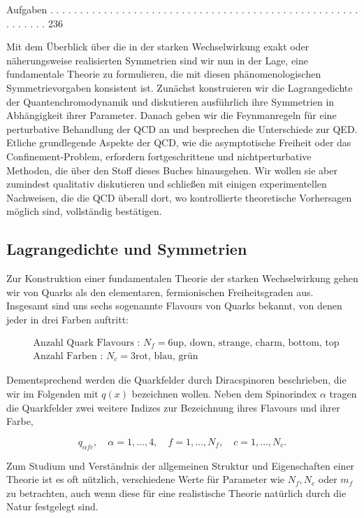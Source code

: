 \documentclass[10pt, letterpaper]{article}
\begin{document}
Aufgaben . . . . . . . . . . . . . . . . . . . . . . . . . . . . . . . . . . . . . . . . . . . . . . . . . . . . . . . . . . . 236

Mit dem Überblick über die in der starken Wechselwirkung exakt oder näherungsweise realisierten Symmetrien sind wir nun in der Lage, eine fundamentale Theorie zu formulieren, die mit diesen phänomenologischen Symmetrievorgaben konsistent ist. Zunächst konstruieren wir die Lagrangedichte der Quantenchromodynamik und diskutieren ausführlich ihre Symmetrien in Abhängigkeit ihrer Parameter. Danach geben wir die Feynmanregeln für eine perturbative Behandlung der QCD an und besprechen die Unterschiede zur QED. Etliche grundlegende Aspekte der QCD, wie die asymptotische Freiheit oder das Confinement-Problem, erfordern fortgeschrittene und nichtperturbative Methoden, die über den Stoff dieses Buches hinausgehen. Wir wollen sie aber zumindest qualitativ diskutieren und schließen mit einigen experimentellen Nachweisen, die die QCD überall dort, wo kontrollierte theoretische Vorhersagen möglich sind, vollständig bestätigen.

\subsection*{Lagrangedichte und Symmetrien}
Zur Konstruktion einer fundamentalen Theorie der starken Wechselwirkung gehen wir von Quarks als den elementaren, fermionischen Freiheitsgraden aus. Insgesamt sind uns sechs sogenannte Flavours von Quarks bekannt, von denen jeder in drei Farben auftritt:

$$
\begin{aligned}
& \text { Anzahl Quark Flavours : } N_{f}=6 \mathrm{up} \text {, down, strange, charm, bottom, top } \\
& \text { Anzahl Farben : } N_{c}=3 \mathrm{rot} \text {, blau, grün }
\end{aligned}
$$

Dementsprechend werden die Quarkfelder durch Diracspinoren beschrieben, die wir im Folgenden mit $q(x)$ bezeichnen wollen. Neben dem Spinorindex $\alpha$ tragen die Quarkfelder zwei weitere Indizes zur Bezeichnung ihres Flavours und ihrer Farbe,

$$
q_{\alpha f c}, \quad \alpha=1, \ldots, 4, \quad f=1, \ldots, N_{f}, \quad c=1, \ldots, N_{c} .
$$

Zum Studium und Verständnis der allgemeinen Struktur und Eigenschaften einer Theorie ist es oft nützlich, verschiedene Werte für Parameter wie $N_{f}, N_{c}$ oder $m_{f}$ zu betrachten, auch wenn diese für eine realistische Theorie natürlich durch die Natur festgelegt sind.
\end{document}
